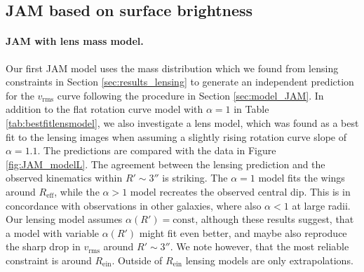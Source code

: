 \subsection{JAM based on surface brightness} \label{sec:results_JAM_SB}

\paragraph{JAM with lens mass model.} Our first JAM model uses the mass distribution which we found from lensing constraints in Section \ref{sec:results_lensing} to generate an independent prediction for the $v_\text{rms}$ curve following the procedure in Section \ref{sec:model_JAM}. In addition to the flat rotation curve model with $\alpha = 1$ in Table \ref{tab:bestfitlensmodel}, we also investigate a lens model, which was found as a best fit to the lensing images when assuming a slightly rising rotation curve slope of $\alpha=1.1$. The predictions are compared with the data in Figure \ref{fig:JAM_modelL}. The agreement between the lensing prediction and the observed kinematics within $R' \sim 3''$ is striking. The $\alpha = 1$ model fits the wings around $R_\text{eff}$, while the $\alpha > 1$ model recreates the observed central dip. This is in concordance with observations in other galaxies, where also $\alpha<1$ at large radii. Our lensing model assumes $\alpha(R')=\text{const}$, although these results suggest, that a model with variable $\alpha(R')$ might fit even better, and maybe also reproduce the sharp drop in $v_\text{rms}$ around $R' \sim 3''$. We note however, that the most reliable constraint is around $R_\text{ein}$. Outside of $R_\text{ein}$ lensing models are only extrapolations.


